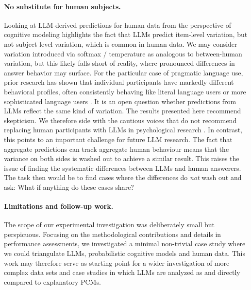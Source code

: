 \documentclass[fleqn]{article}
\begin{document}
\paragraph{No substitute for human subjects.}
Looking at LLM-derived predictions for human data from the perspective of cognitive modeling highlights the fact that LLMs predict item-level variation, but not subject-level variation, which is common in human data.
We may consider variation introduced via softmax / temperature as analogous to between-human variation, but this likely falls short of reality, where pronounced differences in answer behavior may surface.
For the particular case of pragmatic language use, prior research has shown that individual participants have markedly different behavioral profiles, often consistently behaving like literal language users or more sophisticated language users \citep[e.g.,][]{NieuwlandDitman2010:On-the-incremen,FrankeDegen2015:Reasoning-in-Re,SpychalskaKontinen2016:Investigating-s}.
It is an open question whether predictions from LLMs reflect the same kind of variation.
The results presented here recommend skepticism.
We therefore side with the cautious voices that do not recommend replacing human participants with LLMs in psychological research \citep{DillionTandon2023:Can-AI-language,HardingDAlessandro2023:AI-language-mod}.
In contrast, this points to an important challenge for future LLM research.
The fact that aggregate predictions can track aggregate human behaviour means that the variance on both sides is washed out to achieve a similar result.
This raises the issue of finding the systematic differences between LLMs and human answerers.
The task then would be to find cases where the differences do \emph{not} wash out and ask: What if anything do these cases share?

\paragraph{Limitations and follow-up work.}
The scope of our experimental investigation was deliberately small but perspicuous.
Focusing on the methodological contributions and details in performance assessments, we investigated a minimal non-trivial case study where we could triangulate LLMs, probabilistic cognitive models and human data.
This work may therefore serve as starting point for a wider investigation of more complex data sets and case studies in which LLMs are analyzed as and directly compared to explanatory PCMs.
\end{document}

